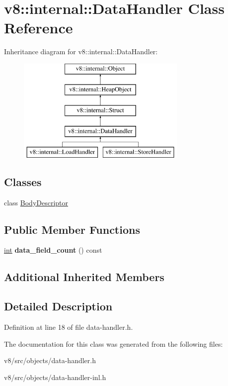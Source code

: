 \hypertarget{classv8_1_1internal_1_1DataHandler}{}\section{v8\+:\+:internal\+:\+:Data\+Handler Class Reference}
\label{classv8_1_1internal_1_1DataHandler}
Inheritance diagram for v8\+:\+:internal\+:\+:Data\+Handler\+:\begin{figure}[H]
\begin{center}
\leavevmode
\includegraphics[height=5.000000cm]{classv8_1_1internal_1_1DataHandler}
\end{center}
\end{figure}
\subsection*{Classes}
\begin{DoxyCompactItemize}
\item 
class \mbox{\hyperlink{classv8_1_1internal_1_1DataHandler_1_1BodyDescriptor}{Body\+Descriptor}}
\end{DoxyCompactItemize}
\subsection*{Public Member Functions}
\begin{DoxyCompactItemize}
\item 
\mbox{\label{classv8_1_1internal_1_1DataHandler_a24602056dfb6717d0f1c0f03e27b1d2e}} 
\mbox{\hyperlink{classint}{int}} {\bfseries data\+\_\+field\+\_\+count} () const
\end{DoxyCompactItemize}
\subsection*{Additional Inherited Members}


\subsection{Detailed Description}


Definition at line 18 of file data-\/handler.\+h.



The documentation for this class was generated from the following files\+:\begin{DoxyCompactItemize}
\item 
v8/src/objects/data-\/handler.\+h\item 
v8/src/objects/data-\/handler-\/inl.\+h\end{DoxyCompactItemize}
